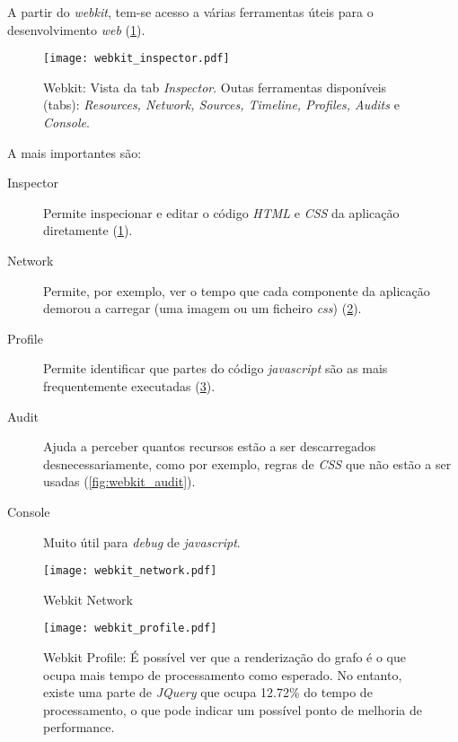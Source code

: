     A partir do \emph{webkit}, tem-se acesso a várias ferramentas úteis para o desenvolvimento \emph{web} (\ref{fig:webkit_inspector}).

    \begin{figure}
      \begin{center}
        \texttt{[image: webkit\_inspector.pdf]}
      \end{center}
      \caption{Webkit: Vista da tab \emph{Inspector}. Outas ferramentas disponíveis (tabs): \emph{Resources, Network, Sources, Timeline, Profiles, Audits} e \emph{Console}.}

      \label{fig:webkit_inspector}
    \end{figure}

    A mais importantes são:

    \begin{description}
      \item[Inspector] Permite inspecionar e editar o código \emph{HTML} e \emph{CSS} da aplicação diretamente  (\ref{fig:webkit_inspector}).
      \item[Network] Permite, por exemplo, ver o tempo que cada componente da aplicação demorou a carregar (uma imagem ou um ficheiro \emph{css}) (\ref{fig:webkit_network}).
      \item[Profile] Permite identificar que partes do código \emph{javascript} são as mais frequentemente executadas (\ref{fig:webkit_profile}).
      \item[Audit] Ajuda a perceber quantos recursos estão a ser descarregados desnecessariamente, como por exemplo, regras de \emph{CSS} que não estão a ser usadas (\ref{fig:webkit_audit}).
      \item[Console] Muito útil para \emph{debug} de \emph{javascript}.

    \end{description}


    \begin{figure}
      \begin{center}
        \texttt{[image: webkit\_network.pdf]}
      \end{center}
      \caption{Webkit Network}
      \label{fig:webkit_network}
    \end{figure}

    \begin{figure}
      \begin{center}
        \texttt{[image: webkit\_profile.pdf]}
      \end{center}
      \caption{Webkit Profile: É possível ver que a renderização do grafo é o que ocupa mais tempo de processamento como esperado. No entanto, existe uma parte de \emph{JQuery} que ocupa 12.72\% do tempo de processamento, o que pode indicar um possível ponto de melhoria de performance.}
      \label{fig:webkit_profile}
    \end{figure}

